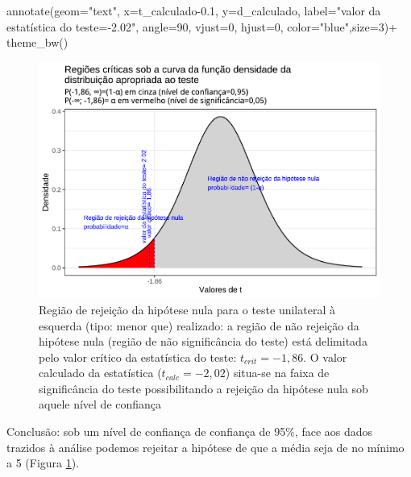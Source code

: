\documentclass[
]{book}
\newenvironment{Shaded}{\begin{snugshade}}{\end{snugshade}}
\newcommand{\AttributeTok}[1]{\textcolor[rgb]{0.77,0.63,0.00}{#1}}
\newcommand{\DecValTok}[1]{\textcolor[rgb]{0.00,0.00,0.81}{#1}}
\newcommand{\FloatTok}[1]{\textcolor[rgb]{0.00,0.00,0.81}{#1}}
\newcommand{\FunctionTok}[1]{\textcolor[rgb]{0.00,0.00,0.00}{#1}}
\newcommand{\NormalTok}[1]{#1}
\newcommand{\SpecialCharTok}[1]{\textcolor[rgb]{0.00,0.00,0.00}{#1}}
\newcommand{\StringTok}[1]{\textcolor[rgb]{0.31,0.60,0.02}{#1}}
\begin{document}
\begin{Shaded}
\begin{Highlighting}[]
 \FunctionTok{annotate}\NormalTok{(}\AttributeTok{geom=}\StringTok{"text"}\NormalTok{, }\AttributeTok{x=}\NormalTok{t\_calculado}\FloatTok{{-}0.1}\NormalTok{, }\AttributeTok{y=}\NormalTok{d\_calculado, }\AttributeTok{label=}\StringTok{"valor da estatística do teste={-}2.02"}\NormalTok{, }\AttributeTok{angle=}\DecValTok{90}\NormalTok{, }\AttributeTok{vjust=}\DecValTok{0}\NormalTok{, }\AttributeTok{hjust=}\DecValTok{0}\NormalTok{, }\AttributeTok{color=}\StringTok{"blue"}\NormalTok{,}\AttributeTok{size=}\DecValTok{3}\NormalTok{)}\SpecialCharTok{+}
  \FunctionTok{theme\_bw}\NormalTok{()}
\end{Highlighting}
\end{Shaded}

\begin{figure}

{\centering \includegraphics[width=1\linewidth]{apostila_files/figure-latex/fig77-1} 

}

\caption{Região de rejeição da hipótese nula para o teste unilateral à esquerda (tipo: menor que) realizado: a região de não rejeição da hipótese nula (região de não significância do teste) está delimitada pelo valor crítico da estatística do teste: $t_{crit} = -1,86$. O valor calculado da estatística ($t_{calc}=-2,02$) situa-se na faixa de significância do teste possibilitando a rejeição da hipótese nula sob aquele nível de confiança}\label{fig:fig77}
\end{figure}

\hfill\break

Conclusão: sob um nível de confiança de confiança de 95\%, face aos dados trazidos à análise podemos rejeitar a hipótese de que a média seja de no mínimo a 5 (Figura \ref{fig:fig77}).
\end{document}
